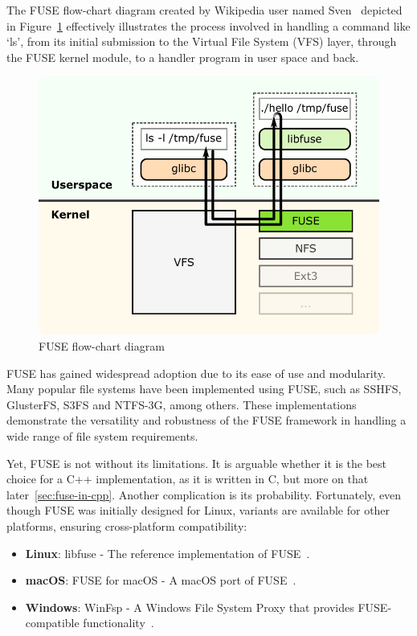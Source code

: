 The FUSE flow-chart diagram created by Wikipedia user named Sven~\cite{fuse-diagram} depicted in Figure~\ref{fig:fuse-diagram} effectively illustrates the process involved in handling a command like `ls', from its initial submission to the Virtual File System (VFS) layer, through the FUSE kernel module, to a handler program in user space and back.

\begin{figure}[ht]
    \centering
    \includegraphics[width=0.8\linewidth]{img/fuse_diagram}
    \caption{FUSE flow-chart diagram}\label{fig:fuse-diagram}
\end{figure}

FUSE has gained widespread adoption due to its ease of use and modularity.
Many popular file systems have been implemented using FUSE, such as SSHFS, GlusterFS, S3FS and NTFS-3G, among others.
These implementations demonstrate the versatility and robustness of the FUSE framework in handling a wide range of file system requirements.

Yet, FUSE is not without its limitations.
It is arguable whether it is the best choice for a C++ implementation, as it is written in C, but more on that later~\ref{sec:fuse-in-cpp}.
Another complication is its probability.
Fortunately, even though FUSE was initially designed for Linux, variants are available for other platforms, ensuring cross-platform compatibility:

\begin{itemize}
    \item \textbf{Linux}: libfuse - The reference implementation of FUSE~\cite{libfuse}.
    \item \textbf{macOS}: FUSE for macOS - A macOS port of FUSE~\cite{osxfuse}.
    \item \textbf{Windows}: WinFsp - A Windows File System Proxy that provides FUSE-compatible functionality~\cite{winfsp}.
\end{itemize}

